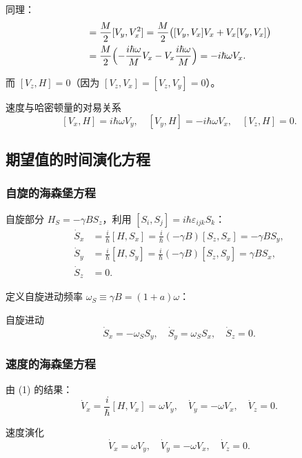 同理：
\begin{align*}
  [V_y, H] &= \frac{M}{2}[V_y, V_x^2]
           = \frac{M}{2}\bigl([V_y,V_x]V_x+V_x[V_y,V_x]\bigr) \\
           &= \frac{M}{2}\Bigl(-\frac{i\hbar\omega}{M}V_x-V_x\frac{i\hbar\omega}{M}\Bigr)
           = -i\hbar\omega V_x.
\end{align*}

而 $[V_z,H]=0$（因为 $[V_z,V_x]=[V_z,V_y]=0$）。

\begin{formulabox}{速度与哈密顿量的对易关系}
\[
  \boxed{[V_x,H]=i\hbar\omega V_y},\quad
  \boxed{[V_y,H]=-i\hbar\omega V_x},\quad
  \boxed{[V_z,H]=0}.
\]
\end{formulabox}


\subsection{期望值的时间演化方程}

\subsubsection{自旋的海森堡方程}

自旋部分 $H_S=-\gamma B S_z$，利用 $[S_i,S_j]=i\hbar\varepsilon_{ijk}S_k$：
\begin{align*}
  \dot S_x &= \frac{i}{\hbar}[H,S_x] = \frac{i}{\hbar}(-\gamma B)[S_z,S_x] = -\gamma B S_y, \\
  \dot S_y &= \frac{i}{\hbar}[H,S_y] = \frac{i}{\hbar}(-\gamma B)[S_z,S_y] = \gamma B S_x, \\
  \dot S_z &= 0.
\end{align*}

定义自旋进动频率 $\omega_S\equiv\gamma B=(1+a)\omega$：
\begin{formulabox}{自旋进动}
\[
  \boxed{\dot S_x=-\omega_S S_y,\quad \dot S_y=\omega_S S_x,\quad \dot S_z=0}.
\]
\end{formulabox}

\subsubsection{速度的海森堡方程}

由 (1) 的结果：
\[
  \dot V_x = \frac{i}{\hbar}[H,V_x] = \omega V_y,\quad
  \dot V_y = -\omega V_x,\quad
  \dot V_z = 0.
\]

\begin{formulabox}{速度演化}
\[
  \boxed{\dot V_x=\omega V_y,\quad \dot V_y=-\omega V_x,\quad \dot V_z=0}.
\]
\end{formulabox}

